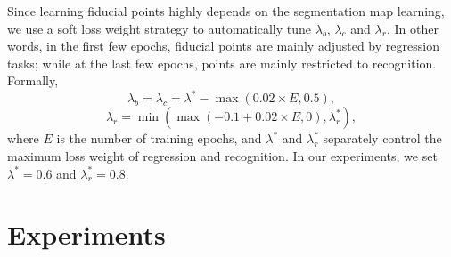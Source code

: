 \documentclass[letterpaper]{article} \usepackage{aaai20}  \usepackage{times}  \usepackage{helvet} \usepackage{courier}  \usepackage[hyphens]{url}  \usepackage{graphicx} \urlstyle{rm} \def\UrlFont{\rm}  \usepackage{graphicx}  \frenchspacing  \setlength{\pdfpagewidth}{8.5in}  \setlength{\pdfpageheight}{11in}  \usepackage{amsmath}
\begin{document}
Since learning fiducial points highly depends on the segmentation map learning, we use a soft loss weight strategy to automatically tune $\lambda_{b}$, $\lambda_{c}$ and $\lambda_{r}$.
In other words, in the first few epochs, fiducial points are mainly adjusted by regression tasks; while at the last few epochs, points are mainly restricted to recognition.
Formally,
\begin{equation}
\lambda_{b} = \lambda_{c} = \lambda^* - \max{(0.02\times E,0.5)},
\end{equation}
\begin{equation}
\lambda_{r} =\min{( \max{(-0.1 + 0.02\times E, 0)}, \lambda_{r}^*)},
\end{equation}
where $E$ is the number of training epochs, and $\lambda^*$ and $\lambda_{r}^*$ separately control the maximum loss weight of regression and recognition.
In our experiments, we set $\lambda^*=0.6$ and $\lambda_{r}^*=0.8$.

\section{Experiments}
\end{document}
